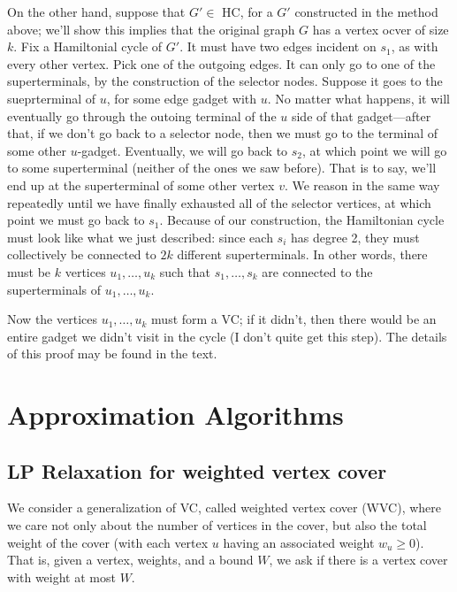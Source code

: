 \documentclass{article}
\begin{document}
On the other hand, suppose that $G'\in$ HC, for a $G'$ constructed in the
method above; we'll show this implies that the original graph $G$ has a 
vertex ocver of size $k$.
Fix a Hamiltonial cycle of $G'$.
It must have two edges incident on $s_1$, as with every other vertex.
Pick one of the outgoing edges. It can only go to one of the superterminals,
by the construction of the selector nodes.
Suppose it goes to the sueprterminal of $u$, for some edge gadget with $u$.
No matter what happens, it will eventually go through the outoing terminal
of the $u$ side of that gadget---after that, if we don't go back to a
selector node, then we must go to the terminal of some other $u$-gadget.
Eventually, we will go back to $s_2$, at which point we will go to
some superterminal (neither of the ones we saw before). That is to say,
we'll end up at the superterminal of some other vertex $v$.
We reason in the same way repeatedly until we have finally exhausted all of the
selector vertices, at which point we must go back to $s_1$.
Because of our construction, the Hamiltonian cycle must look like what we
just described: since each $s_i$ has degree 2, they must collectively
be connected to $2k$ different superterminals.
In other words, there must be $k$ vertices $u_1,\ldots,u_k$ such that
$s_1,\ldots,s_k$ are connected to the
superterminals of $u_1,\ldots,u_k$.

Now the vertices $u_1,\ldots,u_k$ must form a VC; if it didn't, then there
would be an entire gadget we didn't visit in the cycle (I don't quite
get this step). The details of this proof may be found in the text.





\section{Approximation Algorithms}

\subsection{LP Relaxation for weighted vertex cover}

We consider a generalization of VC, called weighted vertex cover (WVC),
where we care not only about the number of vertices in the cover, but
also the total weight of the cover (with each vertex $u$ having
an associated weight $w_u \geq 0$). That is, given a vertex, weights, 
and a bound $W$, we ask if there is a vertex cover with weight
at most $W$.
\end{document}
